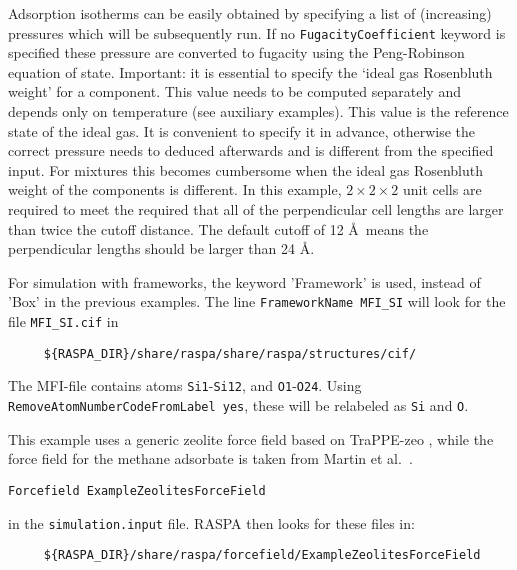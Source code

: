Adsorption isotherms can be easily obtained by specifying a list of (increasing) pressures which will be subsequently run.
If no \verb+FugacityCoefficient+ keyword is specified these pressure are converted to fugacity using the Peng-Robinson equation of state.
Important: it is essential to specify the `ideal gas Rosenbluth weight' for a component. This value needs to be computed separately
and depends only on temperature (see auxiliary examples). This value is the reference state of the ideal gas. It is convenient to specify
it in advance, otherwise the correct pressure needs to deduced afterwards and is different from the specified input. For mixtures this
becomes cumbersome when the ideal gas Rosenbluth weight of the components is different.
In this example, $2\times2\times2$ unit cells are required to meet the required that all of the perpendicular cell lengths are larger than
twice the cutoff distance. The default cutoff of 12 \AA\ means the perpendicular lengths should be larger than 24 \AA.

For simulation with frameworks, the keyword 'Framework' is used, instead of 'Box' in the previous examples.
The line \verb+FrameworkName MFI_SI+ will look for the file \verb+MFI_SI.cif+ in
\begin{verbatim}
     ${RASPA_DIR}/share/raspa/share/raspa/structures/cif/
\end{verbatim}
The MFI-file contains atoms \verb+Si1+-\verb+Si12+, and \verb+O1+-\verb+O24+.
Using \verb+RemoveAtomNumberCodeFromLabel yes+, these will be relabeled as \verb+Si+ and \verb+O+.

This example uses a generic zeolite force field based on TraPPE-zeo \cite{Bai2013}, while
the force field for the methane adsorbate is taken from Martin et al.\ \cite{Martin2001}.
\begin{verbatim}
Forcefield ExampleZeolitesForceField
\end{verbatim}
in the \verb+simulation.input+ file.
RASPA then looks for these files in:
\begin{verbatim}
     ${RASPA_DIR}/share/raspa/forcefield/ExampleZeolitesForceField
\end{verbatim}

